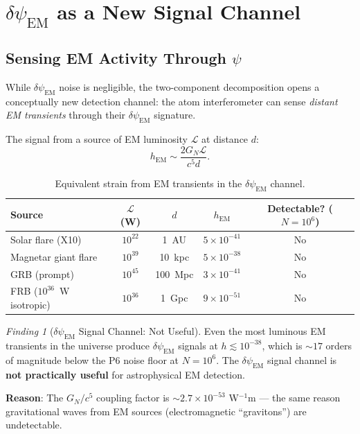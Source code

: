 \documentclass[11pt]{article}
\theoremstyle{definition}
\theoremstyle{remark}
\newtheorem{finding}[theorem]{Finding}
\newcommand{\ee}[1]{\times10^{#1}}
\newcommand{\dpsiem}{\delta\psi_{\mathrm{EM}}}
\newcommand{\GN}{G_N}
\begin{document}
\section{$\dpsiem$ as a New Signal Channel}
\label{sec:P6-signal}

\subsection{Sensing EM Activity Through $\psi$}

While $\dpsiem$ noise is negligible, the two-component decomposition
opens a conceptually new detection channel: the atom interferometer
can sense \emph{distant EM transients} through their $\dpsiem$ signature.

The signal from a source of EM luminosity $\mathcal{L}$ at distance $d$:
\begin{equation}
h_{\mathrm{EM}} \sim \frac{2\GN \mathcal{L}}{c^5 d}.
\label{eq:h-EM-signal}
\end{equation}

\begin{table}[h]
\centering
\caption{Equivalent strain from EM transients in the $\dpsiem$ channel.}
\label{tab:EM-signals}
\begin{tabular}{@{}lcccc@{}}
\toprule
Source & $\mathcal{L}$ (W) & $d$ & $h_{\mathrm{EM}}$ &
  Detectable? ($N=10^6$) \\
\midrule
Solar flare (X10) & $10^{22}$ & 1~AU & $5\ee{-41}$ & No \\
Magnetar giant flare & $10^{39}$ & 10~kpc & $5\ee{-38}$ & No \\
GRB (prompt) & $10^{45}$ & 100~Mpc & $3\ee{-41}$ & No \\
FRB ($10^{36}$~W isotropic) & $10^{36}$ & 1~Gpc & $9\ee{-51}$ & No \\
\bottomrule
\end{tabular}
\end{table}

\begin{finding}[$\dpsiem$ Signal Channel: Not Useful]
\label{finding:P6-EM-signal}
Even the most luminous EM transients in the universe produce $\dpsiem$
signals at $h \lesssim 10^{-38}$, which is $\sim 17$ orders of magnitude
below the P6 noise floor at $N = 10^6$. The $\dpsiem$ signal channel is
\textbf{not practically useful} for astrophysical EM detection.

\textbf{Reason}: The $\GN/c^5$ coupling factor is $\sim 2.7\ee{-53}$
W$^{-1}$m --- the same reason gravitational waves from EM sources
(electromagnetic ``gravitons'') are undetectable.
\end{finding}
\end{document}
